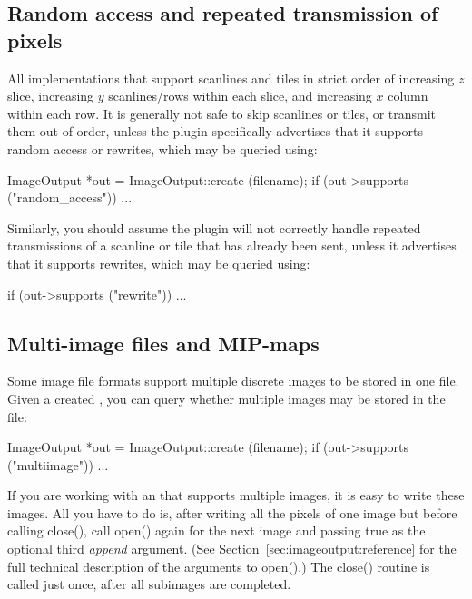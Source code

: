 \subsection{Random access and repeated transmission of pixels}
\label{sec:imageoutput:randomrewrite}

All \ImageOutput implementations that support scanlines and tiles in strict
order of increasing $z$ slice, increasing $y$ scanlines/rows within each
slice, and increasing $x$ column within each row.  It is generally not
safe to skip scanlines or tiles, or transmit them out of order, unless
the plugin specifically advertises that it supports random access or
rewrites, which may be queried using:

\begin{code}
        ImageOutput *out = ImageOutput::create (filename);
        if (out->supports ("random_access"))
            ...
\end{code}

\noindent Similarly, you should assume the plugin will not correctly
handle repeated transmissions of a scanline or tile that has already
been sent, unless it advertises that it supports rewrites, which may be
queried using:

\begin{code}
        if (out->supports ("rewrite"))
            ...
\end{code}


\subsection{Multi-image files and MIP-maps}
\label{sec:imageoutput:multiimage}

Some image file formats support multiple discrete images to be stored
in one file.  Given a created \ImageOutput, you can query whether
multiple images may be stored in the file:

\begin{code}
        ImageOutput *out = ImageOutput::create (filename);
        if (out->supports ("multiimage"))
            ...
\end{code}

If you are working with an \ImageOutput that supports multiple images,
it is easy to write these images.  All you have to do is, after writing
all the pixels of one image but before calling {\cf close()}, call {\cf
  open()} again for the next image and passing {\cf true} as the
optional third \emph{append} argument.  (See
Section~\ref{sec:imageoutput:reference} for the full technical
description of the arguments to {\cf open()}.)  The {\cf close()}
routine is called just once, after all subimages are completed.

